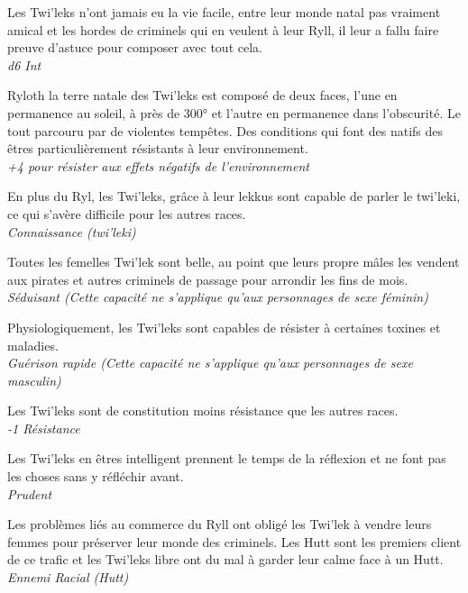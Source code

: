 \begin{description}[align=left]
\item [Rusé \& Astucieux] 			%
		Les Twi’leks n’ont jamais eu la vie facile, entre leur monde natal pas vraiment amical et les hordes de criminels qui en veulent à leur Ryll, il leur a fallu faire preuve d’astuce pour composer avec tout cela.\\
		\textit{d6 Int}

\item [Ni chaud ni froid] 			%
		Ryloth la terre natale des Twi’leks est composé de deux faces, l’une en permanence au soleil, à près de 300° et l’autre en permanence dans l’obscurité. Le tout parcouru par de violentes tempêtes. Des conditions qui font des natifs des êtres particulièrement résistants à leur environnement.\\
		\textit{+4 pour résister aux effets négatifs de l’environnement}

\item [Lekkus Speaking] 			%
		En plus du Ryl, les Twi’leks, grâce à leur lekkus sont capable de parler le twi’leki, ce qui s’avère difficile pour les autres races.\\
		\textit{Connaissance (twi’leki)}

\item [Belle plante (Femelles)] 	%
		Toutes les femelles Twi’lek sont belle, au point que leurs propre mâles les vendent aux pirates et autres criminels de passage pour arrondir les fins de mois.\\
		\textit{Séduisant (Cette capacité ne s’applique qu’aux personnages de sexe féminin)}

\item [Immunisé (Mâles)] 			%
		Physiologiquement, les Twi’leks sont capables de résister à certaines toxines et maladies.\\
		\textit{Guérison rapide (Cette capacité ne s’applique qu’aux personnages de sexe masculin)}

\item [Frêles] 						%
		Les Twi’leks sont de constitution moins résistance que les autres races.\\
		\textit{-1 Résistance}

\item [Prudent] 					%
		Les Twi’leks en êtres intelligent prennent le temps de la réflexion et ne font pas les choses sans y réfléchir avant.\\
		\textit{Prudent}

\item [Hutt(er)] 					%
		Les problèmes liés au commerce du Ryll ont obligé les Twi’lek à vendre leurs femmes pour préserver leur monde des criminels. Les Hutt sont les premiers client de ce trafic et les Twi’leks libre ont du mal à garder leur calme face à un Hutt.\\
		\textit{Ennemi Racial (Hutt)}
\end{description}